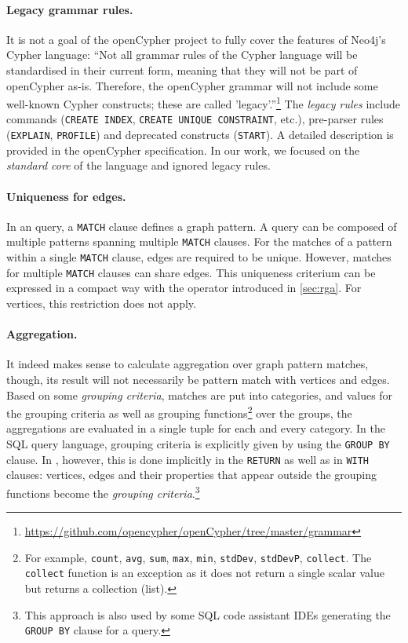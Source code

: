 \paragraph{Legacy grammar rules.} It is not a goal of the openCypher project to fully cover the features of Neo4j's Cypher language: ``Not all grammar rules of the Cypher language will be standardised in their current form, meaning that they will not be part of openCypher as-is. Therefore, the openCypher grammar will not include some well-known Cypher constructs; these are called 'legacy'.''\footnote{\url{https://github.com/opencypher/openCypher/tree/master/grammar}} The \emph{legacy rules} include commands (\lstinline+CREATE INDEX+, \lstinline+CREATE UNIQUE CONSTRAINT+, etc.), pre-parser rules (\lstinline+EXPLAIN+, \lstinline+PROFILE+) and deprecated constructs (\lstinline+START+). A detailed description is provided in the openCypher specification. In our work, we focused on the \emph{standard core} of the language and ignored legacy rules.

\paragraph{Uniqueness for edges.} In an \opencypher query, a \lstinline+MATCH+ clause defines a graph pattern. A query can be composed of multiple patterns spanning multiple \lstinline+MATCH+ clauses. For the matches of a pattern within a single \lstinline+MATCH+ clause, edges are required to be unique. %
However, matches for multiple \lstinline+MATCH+ clauses can share edges. This uniqueness criterium can be expressed in a compact way with the \alldifferenttext operator introduced in \autoref{sec:rga}. For vertices, this restriction does not apply.

\paragraph{Aggregation.} It indeed makes sense to calculate aggregation over graph pattern matches, though, its result will not necessarily be pattern match with vertices and edges. Based on some \emph{grouping criteria}, matches are put into categories, and values for the grouping criteria as well as grouping functions\footnote{For example, \lstinline+count+, \lstinline+avg+, \lstinline+sum+, \lstinline+max+, \lstinline+min+, \lstinline+stdDev+, \lstinline+stdDevP+, \lstinline+collect+. The \lstinline+collect+ function is an exception as it does not return a single scalar value but returns a collection (list).} over the groups, the aggregations are evaluated in a single tuple for each and every category. In the SQL query language, grouping criteria is explicitly given by using the \lstinline+GROUP BY+ clause. In \opencypher, however, this is done implicitly in the \lstinline+RETURN+ as well as in \lstinline+WITH+ clauses: vertices, edges and their properties that appear outside the grouping functions become the \emph{grouping criteria}.\footnote{This approach is also used by some SQL code assistant IDEs generating the \lstinline+GROUP BY+ clause for a query.}


